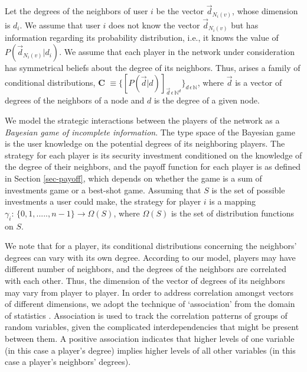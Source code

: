 \documentclass[letterpaper,12pt,onecolumn, nodraft]{IEEEtran}
\begin{document}
Let the degrees of the neighbors of user $i$ be the vector $\overrightarrow d_{N_{i}(v)}$, whose dimension is $ d_{i}$. We assume that user $i$ does not know the vector $\overrightarrow d_{N_{i}(v)}$ but has information regarding its probability distribution, i.e., it knows the value of $P(\overrightarrow d_{N_{i}(v)}|d_{i})$. We assume that each player in the network under consideration has symmetrical beliefs about the degree of its neighbors. Thus, arises a family of conditional distributions, \textbf{C} $\equiv \{[P(\overrightarrow d|d)]_{\overrightarrow d\,\epsilon\,\mathbb{N}^{d}}\}_{d\,\epsilon\,\mathbb{N}}$, where $\overrightarrow d$ is a vector of degrees of the neighbors of a node and $d$ is the degree of a given node.

We model the strategic interactions between the players of the network as a \emph{Bayesian game of incomplete information}. The type space of the Bayesian game is the user knowledge on the potential degrees of its neighboring players. The strategy for each player is its security investment conditioned on the knowledge of the degree of their neighbors, and the payoff function for each player is as defined in Section \ref{sec-payoff}, which depends on whether the game is a sum of investments game or a best-shot game. Assuming that $S$ is the set of possible investments a user could make, the strategy for player $i$ is a mapping $\gamma_{i}:\,\{0,1,....., n - 1\}\rightarrow \Omega(S)$, where $ \Omega(S)$ is the set of distribution functions on $S$. 
  
We note that for a player, its conditional distributions concerning the neighbors' degrees can vary with its own degree. According to our model, players may have different number of neighbors, and the degrees of the neighbors are correlated with each other. Thus, the dimension of the vector of degrees of its neighbors may vary from player to player. In order to address correlation amongst vectors of different dimensions, we adopt the technique of `association' from the domain of statistics \cite{epw}. Association is used to track the correlation patterns of groups of random variables, given the complicated interdependencies that might be present between them. A positive association indicates that higher levels of one variable (in this case a player's degree) implies higher levels of all other variables (in this case a player's neighbors' degrees).  
\end{document}
